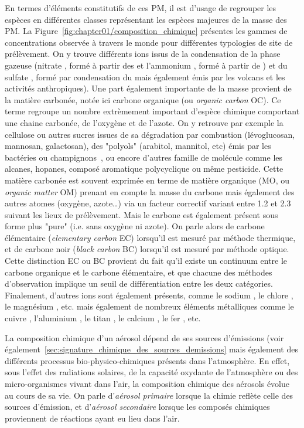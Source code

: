 En termes d'éléments constitutifs de ces PM, il est d'usage de regrouper les espèces en
différentes classes représentant les espèces majeures de la masse des PM. La
Figure~\ref{fig:chapter01/composition_chimique} présentes les gammes de concentrations
observée à travers le monde pour différentes typologies de site de prélèvement.
On y trouve différents ions issus de la condensation de la phase gazeuse (nitrate \NOt, formé à
partir des  et l'ammonium , formé à partir de ) et du sulfate
\SOq, formé par condensation du  mais également émis par les volcans et les
activités anthropiques).
Une part également importante de la masse provient de la matière carbonée, notée ici
carbone organique (ou \textit{organic carbon} OC). Ce terme regroupe un nombre extrèmement
important d'espèce chimique comportant une chaine carbonée, de l'oxygène et
de l'azote. On y retrouve par exemple la cellulose ou autres sucres issues de sa
dégradation par combustion (lévoglucosan, mannosan, galactosan), des "polyols" (arabitol,
mannitol, etc) émis par les bactéries ou champignons~\autocite{samakePolyols2019}, ou encore
d'autres famille de molécule comme les alcanes, hopanes, composé aromatique polycyclique
ou même pesticide. Cette matière carbonée est souvent exprimée en terme de matière
organique (MO, ou \textit{organic matter} OM) prenant en compte la masse du carbone mais
également des autres atomes (oxygène, azote…) via un facteur correctif variant entre 1.2
et 2.3 suivant les lieux de prélèvement.
Mais le carbone est également présent sous forme plus "pure" (i.e. sans oxygène ni azote).
On parle alors de carbone élémentaire (\textit{elementary carbon} EC) lorsqu'il est mesuré
par méthode thermique, et de carbone noir (\textit{black carbon} BC) lorsqu'il est mesuré
par méthode optique. Cette distinction EC ou BC provient du fait qu'il existe un continuum
entre le carbone organique et le carbone élémentaire, et que chacune des méthodes
d'observation implique un seuil de différentiation entre les deux catégories.
Finalement, d'autres ions sont également présents, comme le sodium , le chlore
, le magnésium , etc. mais également de nombreux éléments métalliques
comme le cuivre , l'aluminium , le titan , le calcium , le fer
, etc.

La composition chimique d'un aérosol dépend de ses sources d'émissions (voir
également~\ref{sec:signature_chimique_des_sources_demissions} mais également des
différents processus bio-physico-chimiques présents dans l'atmosphère. En effet, sous
l'effet des radiations solaires, de la capacité oxydante de l'atmosphère ou des
micro-organismes vivant dans l'air, la composition chimique des aérosols évolue au cours
de sa vie. On parle d'\textit{aérosol primaire} lorsque la chimie reflète celle des
sources d'émission, et d'\textit{aérosol secondaire} lorsque les composés chimiques
proviennent de réactions ayant eu lieu dans l'air.

